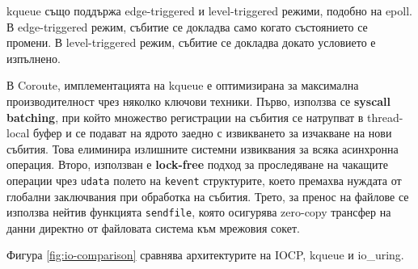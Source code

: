 kqueue също поддържа edge-triggered и level-triggered режими, подобно на epoll. В edge-triggered режим, събитие се докладва само когато състоянието се промени. В level-triggered режим, събитие се докладва докато условието е изпълнено.

В Coroute, имплементацията на kqueue е оптимизирана за максимална производителност чрез няколко ключови техники. Първо, използва се \textbf{syscall batching}, при който множество регистрации на събития се натрупват в thread-local буфер и се подават на ядрото заедно с извикването за изчакване на нови събития. Това елиминира излишните системни извиквания за всяка асинхронна операция. Второ, използван е \textbf{lock-free} подход за проследяване на чакащите операции чрез \texttt{udata} полето на \texttt{kevent} структурите, което премахва нуждата от глобални заключвания при обработка на събития. Трето, за пренос на файлове се използва нейтив функцията \texttt{sendfile}, която осигурява zero-copy трансфер на данни директно от файловата система към мрежовия сокет.

Фигура \ref{fig:io-comparison} сравнява архитектурите на IOCP, kqueue и io\_uring.

